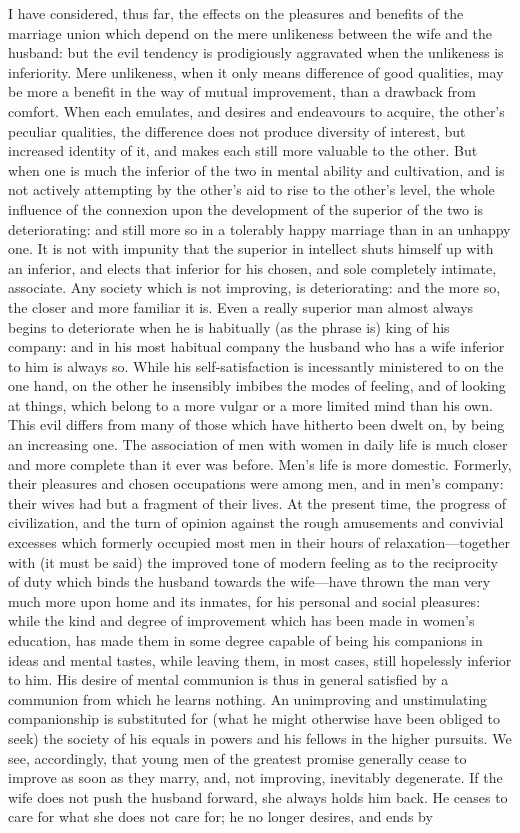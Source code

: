 \documentclass[12pt]{report}
\begin{document}
I have considered, thus far, the effects on the pleasures and benefits of the marriage union which depend on the mere unlikeness between the wife and the husband: but the evil tendency is prodigiously aggravated when the unlikeness is inferiority. Mere unlikeness, when it only means difference of good qualities, may be more a benefit in the way of mutual improvement, than a drawback from comfort. When each emulates, and desires and endeavours to acquire, the other's peculiar qualities, the difference does not produce diversity of interest, but increased identity of it, and makes each still more valuable to the other. But when one is much the inferior of the two in mental ability and cultivation, and is not actively attempting by the other's aid to rise to the other's level, the whole influence of the connexion upon the development of the superior of the two is deteriorating: and still more so in a tolerably happy marriage than in an unhappy one. It is not with impunity that the superior in intellect shuts himself up with an inferior, and elects that inferior for his chosen, and sole completely intimate, associate. Any society which is not improving, is deteriorating: and the more so, the closer and more familiar it is. Even a really superior man almost always begins to deteriorate when he is habitually (as the phrase is) king of his company: and in his most habitual company the husband who has a wife inferior to him is always so. While his self-satisfaction is incessantly ministered to on the one hand, on the other he insensibly imbibes the modes of feeling, and of looking at things, which belong to a more vulgar or a more limited mind than his own. This evil differs from many of those which have hitherto been dwelt on, by being an increasing one. The association of men with women in daily life is much closer and more complete than it ever was before. Men's life is more domestic. Formerly, their pleasures and chosen occupations were among men, and in men's company: their wives had but a fragment of their lives. At the present time, the progress of civilization, and the turn of opinion against the rough amusements and convivial excesses which formerly occupied most men in their hours of relaxation—together with (it must be said) the improved tone of modern feeling as to the reciprocity of duty which binds the husband towards the wife—have thrown the man very much more upon home and its inmates, for his personal and social pleasures: while the kind and degree of improvement which has been made in women's education, has made them in some degree capable of being his companions in ideas and mental tastes, while leaving them, in most cases, still hopelessly inferior to him. His desire of mental communion is thus in general satisfied by a communion from which he learns nothing. An unimproving and unstimulating companionship is substituted for (what he might otherwise have been obliged to seek) the society of his equals in powers and his fellows in the higher pursuits. We see, accordingly, that young men of the greatest promise generally cease to improve as soon as they marry, and, not improving, inevitably degenerate. If the wife does not push the husband forward, she always holds him back. He ceases to care for what she does not care for; he no longer desires, and ends by 
\end{document}

